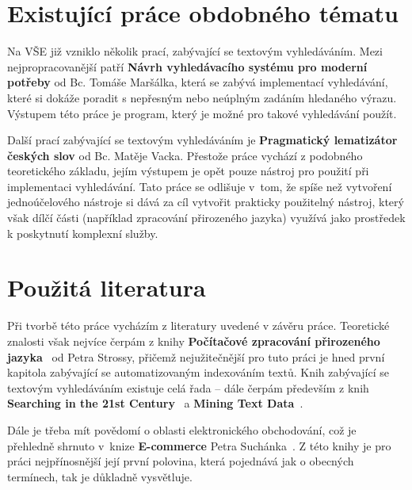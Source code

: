 \documentclass[FM,DP]{tulthesis}
\begin{document}
\section{Existující práce obdobného tématu}

Na VŠE již vzniklo několik prací, zabývající se textovým vyhledáváním. Mezi nejpropracovanější
patří \textbf{Návrh vyhledávacího systému pro moderní potřeby} od Bc. Tomáše Maršálka, která
se zabývá implementací vyhledávání, které si dokáže poradit s nepřesným nebo neúplným zadáním 
hledaného výrazu. Výstupem této práce je program, který je možné pro takové vyhledávání použít. 

Další prací zabývající se textovým vyhledáváním je \textbf{Pragmatický lematizátor českých slov} od
Bc. Matěje Vacka. Přestože práce vychází z podobného teoretického základu, jejím výstupem je
opět pouze nástroj pro použití při implementaci vyhledávání. Tato práce se odlišuje v~tom, 
že spíše než vytvoření jednoúčelového nástroje si dává za cíl vytvořit prakticky použitelný
nástroj, který však dílčí části (například zpracování přirozeného jazyka) využívá jako
prostředek k poskytnutí komplexní služby.

\section{Použitá literatura}

Při tvorbě této práce vycházím z literatury uvedené v závěru práce. Teoretické znalosti však
nejvíce čerpám z knihy \textbf{Počítačové zpracování přirozeného jazyka}~\cite{strossa} 
od Petra Strossy, přičemž nejužitečnější pro tuto práci je hned první kapitola 
zabývající se automatizovaným indexováním textů. Knih zabývající se textovým vyhledáváním existuje
celá řada -- dále čerpám především z knih \textbf{Searching in the 21st Century}~\cite{searching}
a \textbf{Mining Text Data}~\cite{mining}.

Dále je třeba mít povědomí o oblasti elektronického obchodování, což je přehledně shrnuto v~knize
\textbf{E-commerce} Petra Suchánka~\cite{e-commerce}. Z této knihy je pro práci nejpřínosnější 
její první polovina, která pojednává jak o obecných termínech, tak je důkladně vysvětluje.
\end{document}
